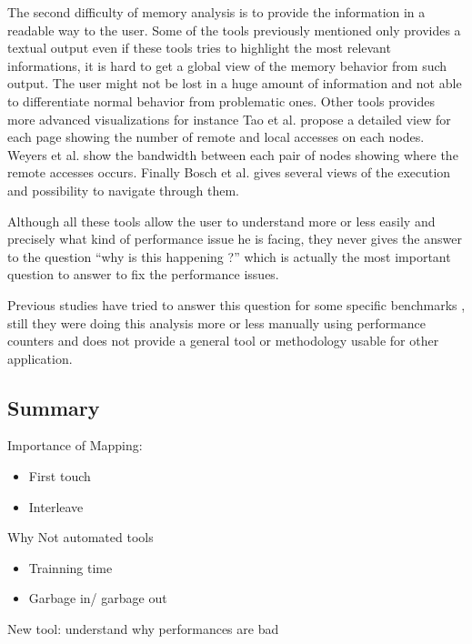 The second difficulty of memory analysis is to provide the information in a
readable way to the user. Some of the tools previously mentioned only provides
a textual output \cite{Lachaize12MemProf,McCurdy2010} even if these tools
tries to highlight the most relevant informations, it is hard to get a global
view of the memory behavior from such output. The user might not be lost in a
huge amount of information and not able to differentiate normal behavior from
problematic ones. Other tools provides more advanced visualizations for
instance Tao et al. \cite{Tao01Visualizing} propose a detailed view for each
page showing the number of remote and local accesses on each nodes. Weyers et
al. \cite{Weyers14Visualization} show the bandwidth between each pair of nodes
showing where the remote accesses occurs. Finally Bosch et al.
\cite{Bosch00Rivet} gives several views of the execution and possibility to
navigate through them.

Although all these tools allow the user to understand more or less easily and
precisely what kind of performance issue he is facing, they never gives the
answer to the question ``why is this happening ?'' which is actually the most
important question to answer to fix the performance issues.

Previous studies have tried to answer this question for some specific
benchmarks \cite{Majo13(Mis)understanding,Jiang14Understanding}, still they
were doing this analysis more or less manually using performance counters and
does not provide a general tool or methodology usable for other application.

\subsection{Summary}



Importance of Mapping:
\begin{itemize}
    \item First touch
    \item Interleave
\end{itemize}

Why Not automated tools
\begin{itemize}
    \item Trainning time
    \item Garbage in/ garbage out
\end{itemize}

New tool: understand why performances are bad
